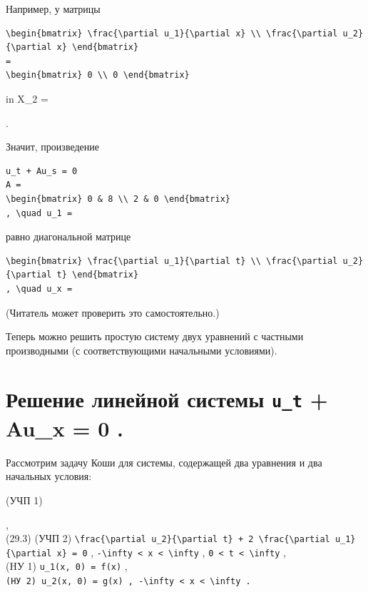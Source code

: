 \documentclass[
  ukrainian,
]{article}
\begin{document}
Например, у матрицы

\begin{verbatim}
\begin{bmatrix} \frac{\partial u_1}{\partial x} \\ \frac{\partial u_2}{\partial x} \end{bmatrix}
=
\begin{bmatrix} 0 \\ 0 \end{bmatrix}
\end{verbatim}

in X\_2 =

.

Значит, произведение

\begin{verbatim}
u_t + Au_s = 0
A =
\begin{bmatrix} 0 & 8 \\ 2 & 0 \end{bmatrix}
, \quad u_1 =
\end{verbatim}

равно диагональной матрице

\begin{verbatim}
\begin{bmatrix} \frac{\partial u_1}{\partial t} \\ \frac{\partial u_2}{\partial t} \end{bmatrix}
, \quad u_x =
\end{verbatim}

(Читатель может проверить это самостоятельно.)

Теперь можно решить простую систему двух уравнений с частными
производными (с соответствующими начальными условиями).

\section{\texorpdfstring{Решение линейной системы \texttt{u\_t} + Au\_x
= 0
.}{Решение линейной системы u\_t + Au\_x = 0 .}}\label{ux440ux435ux448ux435ux43dux438ux435-ux43bux438ux43dux435ux439ux43dux43eux439-ux441ux438ux441ux442ux435ux43cux44b-u_t-au_x-0-.}

Рассмотрим задачу Коши для системы, содержащей два уравнения и два
начальных условия:

(УЧП 1)

,\\
(29.3) (УЧП 2)
\texttt{\textbackslash{}frac\{\textbackslash{}partial\ u\_2\}\{\textbackslash{}partial\ t\}\ +\ 2\ \textbackslash{}frac\{\textbackslash{}partial\ u\_1\}\{\textbackslash{}partial\ x\}\ =\ 0}
,
\texttt{-\textbackslash{}infty\ \textless{}\ x\ \textless{}\ \textbackslash{}infty}
, \texttt{0\ \textless{}\ t\ \textless{}\ \textbackslash{}infty} ,\\
(HУ 1) \texttt{u\_1(x,\ 0)\ =\ f(x)} ,\\
\texttt{(HУ\ 2)\ \textquotesingle{}u\_2(x,\ 0)\ =\ g(x)\textquotesingle{}\ ,\ \textquotesingle{}-\textbackslash{}infty\ \textless{}\ x\ \textless{}\ \textbackslash{}infty\textquotesingle{}\ .}
\end{document}
